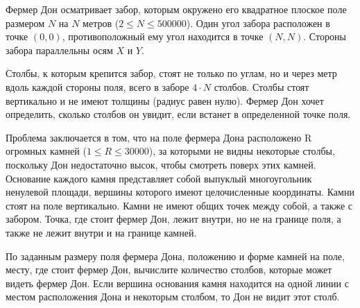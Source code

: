 Фермер Дон осматривает забор, которым окружено его квадратное плоское поле
размером $N$ на $N$ метров ($2 \le N \le 500 000$). Один угол забора расположен в точке
$(0, 0)$, противоположный ему угол находится в точке $(N, N)$. Стороны забора
параллельны осям $X$ и $Y$. 

Столбы, к которым крепится забор, стоят не только по углам, но и через метр вдоль
каждой стороны поля, всего в заборе $4 \cdot N$ столбов. Столбы стоят вертикально и не
имеют толщины (радиус равен нулю). Фермер Дон хочет определить, сколько
столбов он увидит, если встанет в определенной точке поля. 

Проблема заключается в том, что на поле фермера Дона расположено R огромных
камней ($1 \le R \le 30 000$), за которыми не видны некоторые столбы, поскольку Дон
недостаточно высок, чтобы смотреть поверх этих камней. Основание каждого
камня представляет собой выпуклый многоугольник ненулевой площади, вершины
которого имеют целочисленные координаты. Камни стоят на поле вертикально. 
Камни не имеют общих точек между собой, а также с забором. Точка, где стоит
фермер Дон, лежит внутри, но не на границе поля, а также не лежит внутри и на
границе камней. 

По заданным размеру поля фермера Дона, положению и форме камней на поле, 
месту, где стоит фермер Дон, вычислите количество столбов, которые может
видеть фермер Дон. Если вершина основания камня находится на одной линии с
местом расположения Дона и некоторым столбом, то Дон не видит этот столб.
